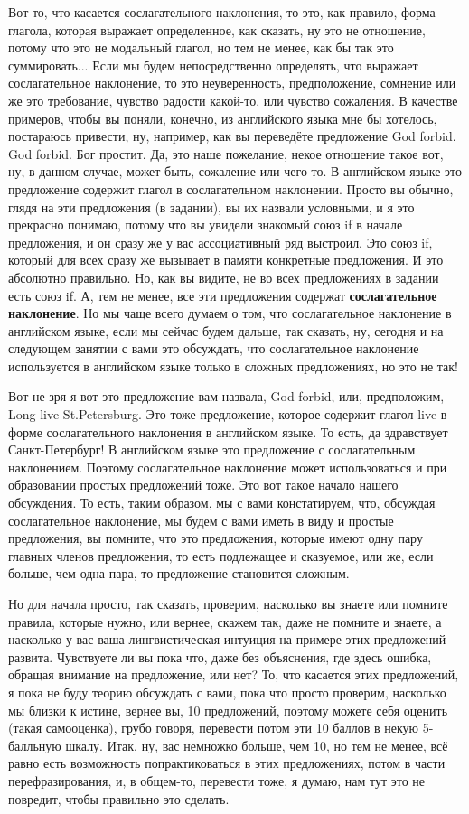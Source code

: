 \documentclass[main.tex]{subfiles}
\begin{document}
Вот то, что касается сослагательного наклонения, то это, как правило, форма глагола, которая выражает определенное, как сказать, ну это не отношение, потому что это не модальный глагол, но тем не менее, как бы так это суммировать...
Если мы будем непосредственно определять, что выражает сослагательное наклонение, то это неуверенность, предположение, сомнение или же это требование, чувство радости какой-то, или чувство сожаления.
В качестве примеров, чтобы вы поняли, конечно, из английского языка мне бы хотелось, постараюсь привести, ну, например, как вы переведёте предложение God forbid.
God forbid.
Бог простит.
Да, это наше пожелание, некое отношение такое вот, ну, в данном случае, может быть, сожаление или чего-то.
В английском языке это предложение содержит глагол в сослагательном наклонении.
Просто вы обычно, глядя на эти предложения (в задании), вы их назвали условными, и я это прекрасно понимаю, потому что вы увидели знакомый союз if в начале предложения, и он сразу же у вас ассоциативный ряд выстроил.
Это союз if, который для всех сразу же вызывает в памяти конкретные предложения.
И это абсолютно правильно.
Но, как вы видите, не во всех предложениях в задании есть союз if.
А, тем не менее, все эти предложения содержат \textbf{сослагательное наклонение}.
Но мы чаще всего думаем о том, что сослагательное наклонение в английском языке, если мы сейчас будем дальше, так сказать, ну, сегодня и на следующем занятии с вами это обсуждать, что сослагательное наклонение используется в английском языке только в сложных предложениях, но это не так!

Вот не зря я вот это предложение вам назвала, God forbid, или, предположим, Long live St.Petersburg.
Это тоже предложение, которое содержит глагол live в форме сослагательного наклонения в английском языке.
То есть, да здравствует Санкт-Петербург!
В английском языке это предложение с сослагательным наклонением.
Поэтому сослагательное наклонение может использоваться и при образовании простых предложений тоже.
Это вот такое начало нашего обсуждения.
То есть, таким образом, мы с вами констатируем, что, обсуждая сослагательное наклонение, мы будем с вами иметь в виду и простые предложения, вы помните, что это предложения, которые имеют одну пару главных членов предложения, то есть подлежащее и сказуемое, или же, если больше, чем одна пара, то предложение становится сложным.

Но для начала просто, так сказать, проверим, насколько вы знаете или помните правила, которые нужно, или вернее, скажем так, даже не помните и знаете, а насколько у вас ваша лингвистическая интуиция на примере этих предложений развита.
Чувствуете ли вы пока что, даже без объяснения, где здесь ошибка, обращая внимание на предложение, или нет?
То, что касается этих предложений, я пока не буду теорию обсуждать с вами, пока что просто проверим, насколько мы близки к истине, вернее вы, 10 предложений, поэтому можете себя оценить (такая самооценка), грубо говоря, перевести потом эти 10 баллов в некую 5-балльную шкалу.
Итак, ну, вас немножко больше, чем 10, но тем не менее, всё равно есть возможность попрактиковаться в этих предложениях, потом в части перефразирования, и, в общем-то, перевести тоже, я думаю, нам тут это не повредит, чтобы правильно это сделать.
\end{document}
